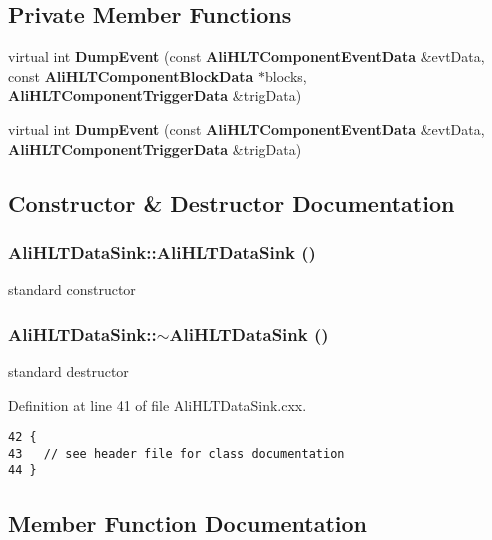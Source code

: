 \subsection*{Private Member Functions}
\begin{CompactItemize}
\item 
virtual int {\bf Dump\-Event} (const {\bf Ali\-HLTComponent\-Event\-Data} \&evt\-Data, const {\bf Ali\-HLTComponent\-Block\-Data} $\ast$blocks, {\bf Ali\-HLTComponent\-Trigger\-Data} \&trig\-Data)
\item 
virtual int {\bf Dump\-Event} (const {\bf Ali\-HLTComponent\-Event\-Data} \&evt\-Data, {\bf Ali\-HLTComponent\-Trigger\-Data} \&trig\-Data)
\end{CompactItemize}


\subsection{Constructor \& Destructor Documentation}
\subsubsection{\setlength{\rightskip}{0pt plus 5cm}Ali\-HLTData\-Sink::Ali\-HLTData\-Sink ()}\label{classAliHLTDataSink_a0}


standard constructor 
\subsubsection{\setlength{\rightskip}{0pt plus 5cm}Ali\-HLTData\-Sink::$\sim${\bf Ali\-HLTData\-Sink} ()\hspace{0.3cm}{\tt  [virtual]}}\label{classAliHLTDataSink_a1}


standard destructor 

Definition at line 41 of file Ali\-HLTData\-Sink.cxx.

\footnotesize\begin{verbatim}42 { 
43   // see header file for class documentation
44 }
\end{verbatim}\normalsize 




\subsection{Member Function Documentation}
